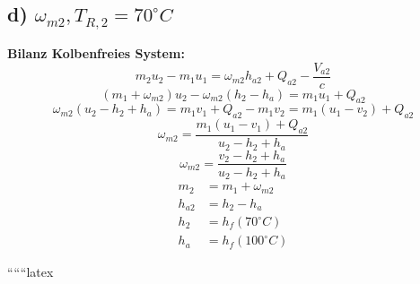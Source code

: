 \subsection*{d) $\omega_{m2}, T_{R,2} = 70^\circ C$}
\textbf{Bilanz Kolbenfreies System:}
\[
m_2 u_2 - m_1 u_1 = \omega_{m2} h_{a2} + Q_{a2} - \frac{V_{a2}}{c}
\]
\[
(m_1 + \omega_{m2}) u_2 - \omega_{m2} (h_2 - h_a) = m_1 u_1 + Q_{a2}
\]
\[
\omega_{m2} (u_2 - h_2 + h_a) = m_1 v_1 + Q_{a2} - m_1 v_2 = m_1 (u_1 - v_2) + Q_{a2}
\]
\[
\omega_{m2} = \frac{m_1 (u_1 - v_1) + Q_{a2}}{u_2 - h_2 + h_a}
\]
\[
\omega_{m2} = \frac{v_2 - h_2 + h_a}{u_2 - h_2 + h_a}
\]
\[
\begin{aligned}
    m_2 &= m_1 + \omega_{m2} \\
    h_{a2} &= h_2 - h_a \\
    h_2 &= h_f (70^\circ C) \\
    h_a &= h_f (100^\circ C)
\end{aligned}
\]

``````latex